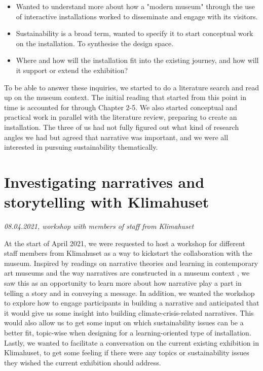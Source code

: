 \begin{itemize}
    \item Wanted to understand more about how a "modern museum" through the use of interactive installations worked to disseminate and engage with its visitors.
    \item Sustainability is a broad term, wanted to specify it to start conceptual work on the installation. To synthesise the design space.
    \item Where and how will the installation fit into the existing journey, and how will it support or extend the exhibition?
\end{itemize}

To be able to answer these inquiries, we started to do a literature search and read up on the museum context. The initial reading that started from this point in time is accounted for through Chapter 2-5. We also started conceptual and practical work in parallel with the literature review, preparing to create an installation. The three of us had not fully figured out what kind of research angles we had but agreed that narrative was important, and we were all interested in pursuing sustainability thematically.


\section{Investigating narratives and storytelling with Klimahuset}
\par
\emph{08.04.2021, workshop with members of staff from Klimahuset}
\par

At the start of April 2021, we were requested to host a workshop for different staff members from Klimahuset as a way to kickstart the collaboration with the museum. Inspired by readings on narrative theories and learning in contemporary art museums and the way narratives are constructed in a museum context \autocite{narrative_sitzia}, we saw this as an opportunity to learn more about how narrative play a part in telling a story and in conveying a message. In addition, we wanted the workshop to explore how to engage participants in building a narrative and anticipated that it would give us some insight into building climate-crisis-related narratives. This would also allow us to get some input on which sustainability issues can be a better fit, topic-wise when designing for a learning-oriented type of installation. Lastly, we wanted to facilitate a conversation on the current existing exhibition in Klimahuset, to get some feeling if there were any topics or sustainability issues they wished the current exhibition should address. 

